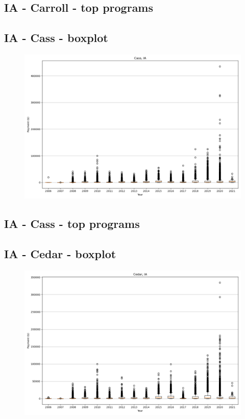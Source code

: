 \subsection*{IA - Carroll - top programs}

\newpage
\subsection*{IA - Cass - boxplot}
\begin{figure}[h]
\centering
\includegraphics[width=7in]{../output/boxplots/counties/Cass-IA_boxplot.png}
\end{figure}


\subsection*{IA - Cass - top programs}

\newpage
\subsection*{IA - Cedar - boxplot}
\begin{figure}[h]
\centering
\includegraphics[width=7in]{../output/boxplots/counties/Cedar-IA_boxplot.png}
\end{figure}


